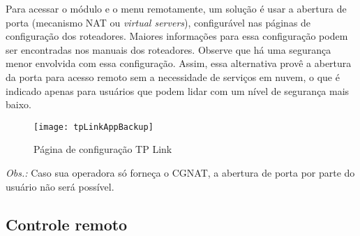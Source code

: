 Para acessar o módulo e o menu remotamente, um solução é usar a abertura de porta (mecanismo NAT ou \emph{virtual servers}), configurável nas páginas de configuração dos roteadores. Maiores informações para essa configuração podem ser encontradas nos manuais dos roteadores. Observe que há uma segurança menor envolvida com essa configuração. Assim, essa alternativa provê a abertura da porta para acesso remoto sem a necessidade de serviços em nuvem, o que é indicado apenas para usuários que podem lidar com um nível de segurança mais baixo.

\begin{figure}[H]
    \centering
    \caption{Página de configuração TP Link}
    \texttt{[image: tpLinkAppBackup]}
    \label{fig:tpLinkAppBackup}
\end{figure}

\emph{Obs.:} Caso sua operadora só forneça o CGNAT, a abertura de porta por parte do usuário não será possível.

\subsection{Controle remoto}

